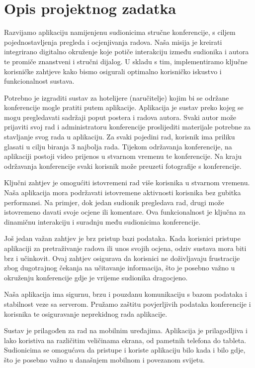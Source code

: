 \chapter{Opis projektnog zadatka}
		
		Razvijamo aplikaciju namijenjenu sudionicima stručne konferencije, s ciljem pojednostavljenja pregleda i ocjenjivanja radova. Naša misija je kreirati integrirano digitalno okruženje koje potiče interakciju između sudionika i autora te promiče znanstveni i stručni dijalog. U skladu s tim, implementiramo ključne korisničke zahtjeve kako bismo osigurali optimalno korisničko iskustvo i funkcionalnost sustava.
		
		Potrebno je izgraditi sustav za hotelijere (naručitelje) kojim bi se održane konferencije mogle pratiti putem aplikacije. Aplikacija je sustav preko kojeg se mogu pregledavati sadržaji poput postera i radova autora. Svaki autor može prijaviti svoj rad i administratoru konferencije proslijediti materijale potrebne za stavljanje svog rada u aplikaciju. Za svaki pojedini rad, korisnik ima priliku glasati u cilju biranja 3 najbolja rada. Tijekom održavanja konferencije, na aplikaciji postoji video prijenos u stvarnom vremenu te konferencije. Na kraju održavanja konferencije svaki korisnik može preuzeti fotografije s konferencije.
		
		Ključni zahtjev je omogućiti istovremeni rad više korisnika u stvarnom vremenu. Naša aplikacija mora podržavati istovremene aktivnosti korisnika bez gubitka performansi. Na primjer, dok jedan sudionik pregledava rad, drugi može istovremeno davati svoje ocjene ili komentare. Ova funkcionalnost je ključna za dinamičnu interakciju i suradnju među sudionicima konferencije.
		
		Još jedan važan zahtjev je brz pristup bazi podataka. Kada korisnici pristupe aplikaciji za pretraživanje radova ili unos svojih ocjena, odziv sustava mora biti brz i učinkovit. Ovaj zahtjev osigurava da korisnici ne doživljavaju frustracije zbog dugotrajnog čekanja na učitavanje informacija, što je posebno važno u okruženju konferencije gdje je vrijeme sudionika dragocjeno.
		
		Naša aplikacija ima sigurnu, brzu i pouzdanu komunikaciju s bazom podataka i stabilnost veze sa serverom. Pružamo zaštitu povjerljivih podataka konferencije i korisnika te osiguravanje neprekidnog rada aplikacije.
		
		\newpage
		
		Sustav je prilagođen za rad na mobilnim uređajima. Aplikacija je prilagodljiva i lako koristiva na različitim veličinama ekrana, od pametnih telefona do tableta. Sudionicima se omogućava da pristupe i koriste aplikaciju bilo kada i bilo gdje, što je posebno važno u današnjem mobilnom i povezanom svijetu.
		

